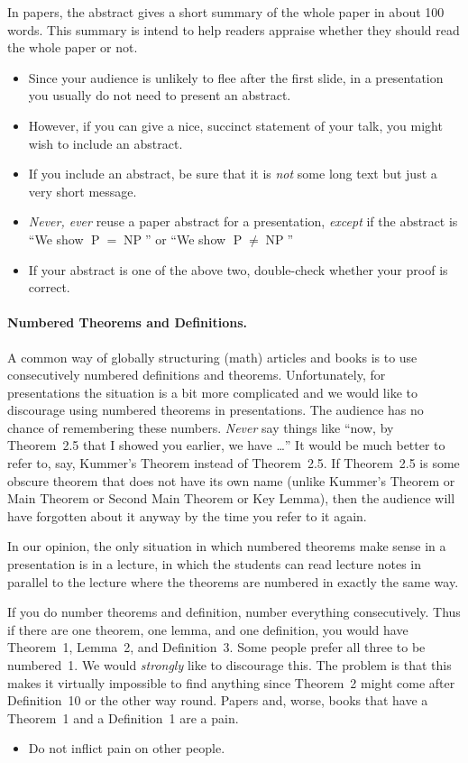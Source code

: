 In papers, the abstract gives a short summary of the whole paper in about 100 words. This summary is intend to help readers appraise whether they should read the whole paper or not.
\begin{itemize}
\item
  Since your audience is unlikely to flee after the first slide, in a presentation you usually do not need to present an abstract.
\item
  However, if you can give a nice, succinct statement of your talk, you might wish to include an abstract.
\item
  If you include an abstract, be sure that it is \emph{not} some long text but just a very short message.
\item
  \emph{Never, ever} reuse a paper abstract for a presentation, \emph{except} if the abstract is ``We show $\operatorname{P} = \operatorname{NP}$'' or ``We show $\operatorname{P} \neq \operatorname{NP}$''
\item
  If your abstract is one of the above two, double-check whether your proof is correct.
\end{itemize}

\paragraph{Numbered Theorems and Definitions.}

A common way of globally structuring (math) articles and books is to use consecutively numbered definitions and theorems. Unfortunately, for presentations the situation is a bit more complicated and we would like to discourage using numbered theorems in presentations. The audience has no chance of remembering these numbers. \emph{Never} say things like ``now, by Theorem~2.5 that I showed you earlier, we have \dots'' It would be much better to refer to, say, Kummer's Theorem instead of Theorem~2.5. If Theorem~2.5 is some obscure theorem that does not have its own name (unlike Kummer's Theorem or Main Theorem or Second Main Theorem or Key Lemma), then the audience will have forgotten about it anyway by the time you refer to it again.

In our opinion, the only situation in which numbered theorems make sense in a presentation is in a lecture, in which the students can read lecture notes in parallel to the lecture where the theorems are numbered in exactly the same way.

If you do number theorems and definition, number everything consecutively. Thus if there are one theorem, one lemma, and one definition, you would have Theorem~1, Lemma~2, and Definition~3. Some people prefer all three to be numbered~1. We would \emph{strongly} like to discourage this. The problem is that this makes it virtually impossible to find anything since Theorem~2 might come after Definition~10 or the other way round. Papers and, worse, books that have a Theorem~1 and a Definition~1 are a pain.
\begin{itemize}
\item
  Do not inflict pain on other people.
\end{itemize}

